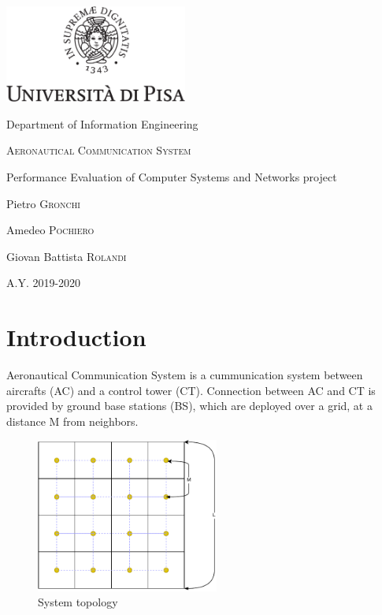 \documentclass[a4paper,12pt]{article}
\newcommand{\projectname}{Aeronautical Communication System}
\begin{document}

{
  \begin{titlepage}
  	\centering
  	\includegraphics[width=6cm]{img/unipi.pdf}\par
    \vspace{1.5cm}
    {\Large Department of Information Engineering \par}
  	\vspace{1.5cm}
  	{\huge\textsc{\projectname{}}\par}
    \vspace{0.5cm}
    {\Large Performance Evaluation of Computer Systems and Networks project \par}
  	\vspace{2cm}
  	Pietro \textsc{Gronchi}\par
  	Amedeo \textsc{Pochiero}\par
    Giovan Battista \textsc{Rolandi}

  	\vfill

  	{\large A.Y. 2019-2020\par}
  \end{titlepage}
}


\clearpage
\tableofcontents
\clearpage
{}

\section{Introduction}
\projectname{} is a cummunication system between aircrafts (AC) and a control tower (CT).
Connection between AC and CT is provided by ground base stations (BS), which are deployed over a grid, at a distance M from neighbors.

\begin{figure}[H]
  \centering
  \includegraphics[width=6cm]{img/grid.pdf}
  \caption{System topology}
  \label{fig:grid}
\end{figure}
\end{document}
